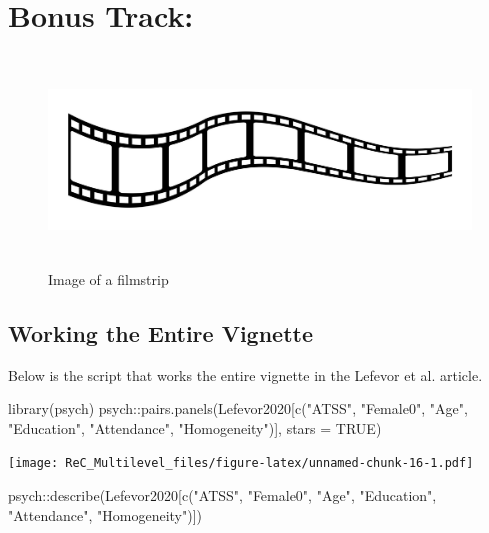 \documentclass[
  11pt,
]{book}
\newenvironment{Shaded}{\begin{snugshade}}{\end{snugshade}}
\newcommand{\AttributeTok}[1]{\textcolor[rgb]{0.77,0.63,0.00}{#1}}
\newcommand{\ConstantTok}[1]{\textcolor[rgb]{0.00,0.00,0.00}{#1}}
\newcommand{\FunctionTok}[1]{\textcolor[rgb]{0.00,0.00,0.00}{#1}}
\newcommand{\NormalTok}[1]{#1}
\newcommand{\SpecialCharTok}[1]{\textcolor[rgb]{0.00,0.00,0.00}{#1}}
\newcommand{\StringTok}[1]{\textcolor[rgb]{0.31,0.60,0.02}{#1}}
\begin{document}
\hypertarget{bonus-track}{%
\section{Bonus Track:}\label{bonus-track}}

\begin{figure}
\hypertarget{id}{%
\centering
\includegraphics[width=6.45833in,height=2.19792in]{images/film-strip-1.jpg}
\caption{Image of a filmstrip}\label{id}
}
\end{figure}

\hypertarget{working-the-entire-vignette}{%
\subsection{Working the Entire Vignette}\label{working-the-entire-vignette}}

Below is the script that works the entire vignette in the Lefevor et al. \citeyearpar{lefevor_homonegativity_2020} article.

\begin{Shaded}
\begin{Highlighting}[]
\FunctionTok{library}\NormalTok{(psych)}
\NormalTok{psych}\SpecialCharTok{::}\FunctionTok{pairs.panels}\NormalTok{(Lefevor2020[}\FunctionTok{c}\NormalTok{(}\StringTok{"ATSS"}\NormalTok{, }\StringTok{"Female0"}\NormalTok{, }\StringTok{"Age"}\NormalTok{, }\StringTok{"Education"}\NormalTok{, }\StringTok{"Attendance"}\NormalTok{, }\StringTok{"Homogeneity"}\NormalTok{)], }\AttributeTok{stars =} \ConstantTok{TRUE}\NormalTok{)}
\end{Highlighting}
\end{Shaded}

\texttt{[image: ReC\_Multilevel\_files/figure-latex/unnamed-chunk-16-1.pdf]}

\begin{Shaded}
\begin{Highlighting}[]
\NormalTok{psych}\SpecialCharTok{::}\FunctionTok{describe}\NormalTok{(Lefevor2020[}\FunctionTok{c}\NormalTok{(}\StringTok{"ATSS"}\NormalTok{, }\StringTok{"Female0"}\NormalTok{, }\StringTok{"Age"}\NormalTok{, }\StringTok{"Education"}\NormalTok{, }\StringTok{"Attendance"}\NormalTok{, }\StringTok{"Homogeneity"}\NormalTok{)])}
\end{Highlighting}
\end{Shaded}
\end{document}
